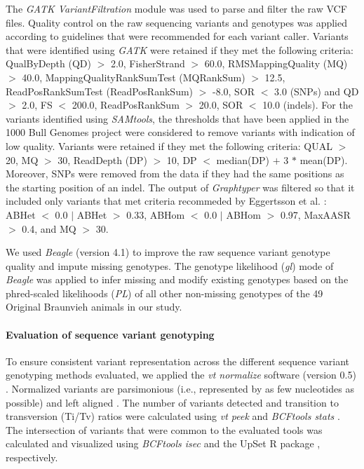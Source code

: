 \documentclass[../main.tex]{subfiles}
\begin{document}
The \emph{GATK VariantFiltration} module was used to parse and filter the raw VCF files. Quality control on the raw sequencing variants and genotypes was applied according to guidelines that were recommended for each variant caller. Variants that were identified using \emph{GATK} were retained if they met the following criteria: QualByDepth (QD) $>$ 2.0, FisherStrand $>$ 60.0, RMSMappingQuality (MQ) $>$ 40.0, MappingQualityRankSumTest (MQRankSum) $>$ 12.5, ReadPosRankSumTest (ReadPosRankSum) $>$ -8.0, SOR $<$ 3.0 (SNPs) and QD $>$ 2.0, FS $<$ 200.0, ReadPosRankSum $>$ 20.0, SOR $<$ 10.0 (indels). For the variants identified using \emph{SAMtools}, the thresholds that have been applied in the 1000 Bull Genomes project \citep{Daetwyler2014} were considered to remove variants with indication of low quality. Variants were retained if they met the following criteria: QUAL $>$ 20, MQ $>$ 30, ReadDepth (DP) $>$ 10, DP $<$ median(DP) $+$ 3 $*$ mean(DP).   
Moreover, SNPs were removed from the data if they had the same positions as the starting position of an indel. The output of \emph{Graphtyper} was filtered so that it included only variants that met criteria recommeded by Eggertsson et al. \citep{eggertsson2017graphtyper}: ABHet $<$ 0.0 $|$ ABHet $>$ 0.33, ABHom $<$ 0.0 $|$ ABHom $>$ 0.97, MaxAASR $>$ 0.4, and MQ $>$ 30. 

We used \emph{Beagle} (version 4.1) \citep{browning2016genotype} to improve the raw sequence variant genotype quality and impute missing genotypes. The genotype likelihood (\emph{gl}) mode of \emph{Beagle} was applied to infer missing and modify existing genotypes based on the phred-scaled likelihoods (\emph{PL}) of all other non-missing genotypes of the 49 Original Braunvieh animals in our study.

\paragraph{Evaluation of sequence variant genotyping}

To ensure consistent variant representation across the different sequence variant genotyping methods evaluated, we applied the \emph{vt normalize} software (version 0.5) \citep{tan2015unified}. Normalized variants are parsimonious (i.e., represented by as few nucleotides as possible) and left aligned \citep{tan2015unified}. The number of variants detected and transition to transversion (Ti/Tv) ratios were calculated using \emph{vt peek} \citep{tan2015unified} and \emph{BCFtools stats} \citep{li2011statistical}. The intersection of variants that were common to the evaluated tools was calculated and visualized using \emph{BCFtools isec} \citep{li2011statistical} and the UpSet R package \citep{conway2017upsetr}, respectively.
\end{document}
